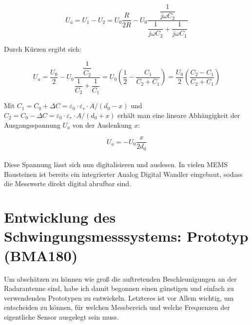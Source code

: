 \documentclass[12pt,a4paper]{scrartcl}
\begin{document}
\begin{equation}
U_a = U_1 - U_2 = U_0 \frac{R}{2 R} - U_0 \dfrac{\dfrac{1}{j \omega C_2} } { \dfrac{1} {j \omega C_2} + \dfrac{1}{j \omega C_1} }
\end{equation}

Durch Kürzen ergibt sich:

\begin{equation}
U_a = \frac{U_0}{2} - U_0 \dfrac{\dfrac{1}{C_2}}{\dfrac{1}{C_2} + \dfrac{1}{C_1}} = U_0 \left( \frac{1}{2} - \frac{C_1}{C_2 + C_1} \right) = \frac{U_0}{2} \left( \frac{C_2 - C_1}{C_2 + C_1} \right)
\end{equation}

Mit $C_1 = C_0 + \Delta C = \varepsilon _0 \cdot \varepsilon _r \cdot A / (d_0 - x )$ und $C_2 = C_0 - \Delta C = \varepsilon _0 \cdot \varepsilon _r \cdot A / (d_0 + x )$ erhält man eine lineare Abhängigkeit der Ausgangsspannung $U_a$ von der Auslenkung  $x$:

\begin{equation}
U_a = - U_0 \frac{x}{2 d_0}
\end{equation}\\


Diese Spannung lässt sich nun digitalisieren und auslesen. In vielen MEMS Bausteinen ist bereits ein integrierter Analog Digital Wandler eingebaut, sodass die Messwerte direkt digital abrufbar sind. 

\newpage

\section{Entwicklung des Schwingungsmesssystems: Prototyp (BMA180)}

Um abschätzen zu können wie groß die auftretenden Beschleunigungen an der Radarantenne sind, habe ich damit begonnen einen günstigen und einfach zu verwendenden Prototypen zu entwickeln. Letzteres ist vor Allem wichtig, um entscheiden zu können, für welchen Messbereich und welche Frequenzen der eigentliche Sensor ausgelegt sein muss. \\
\end{document}
